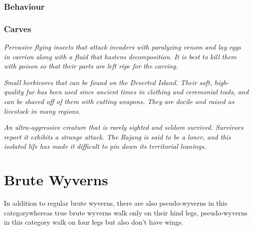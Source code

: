 \subsubsection{Behaviour}

\subsubsection{Carves}

\textit{Pervasive flying insects that attack invaders with paralyzing venom and lay eggs in carrion along with a fluid that hastens decomposition. It is best to kill them with poison so that their parts are left ripe for the carving.}

\textit{Small herbivores that can be found on the Deserted Island. Their soft, high-quality fur has been used since ancient times in clothing and ceremonial tools, and can be shaved off of them with cutting weapons. They are docile and raised as livestock in many regions.}

\textit{An ultra-aggressive creature that is rarely sighted and seldom survived. Survivors report it exhibits a strange attack. The Rajang is said to be a loner, and this isolated life has made it difficult to pin down its territorial leanings.}

\section{Brute Wyverns}
In addition to regular brute wyverns, there are also pseudo-wyverns in this category\hbNone whereas true brute wyverns walk only on their hind legs, pseudo-wyverns in this category walk on four legs but also don't have wings.

